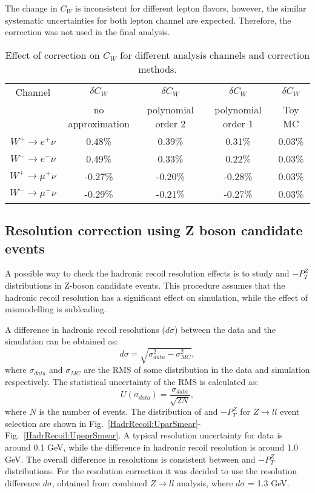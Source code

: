 The change in $C_W$ is inconsistent for different lepton flavors, however, the similar systematic uncertainties for both lepton channel are expected. Therefore, the correction was not used in the final analysis.

 \begin{table}[!t]
 \caption{Effect of \sumet correction on $C_{W}$ for different analysis channels and \sumet correction methods.}
\label{SumetCW}
\begin{center}
\begin{tabular}{c | c | c |  c |  c   }
\hline
Channel & $\delta C_W$ & $\delta C_W$ & $\delta C_W$ & $\delta C_W$ \\
& no approximation & polynomial order 2 & polynomial order 1 & Toy MC \\
\hline
\hline
$W^{+} \to e^{+}\nu$ & 0.48\% &0.39\%  & 0.31\% & 0.03\% \\
$W^{-} \to e^{-}\nu$ & 0.49\% &0.33\%  & 0.22\% & 0.03\% \\
$W^{+} \to \mu^{+}\nu$ & -0.27\% &-0.20\%  & -0.28\% & 0.03\% \\
$W^{-} \to \mu^{-}\nu$ & -0.29\% &-0.21\%  & -0.27\% & 0.03\% \\
\hline
\end{tabular}
\end{center}

\end{table}


\subsection{Resolution correction using Z boson candidate events}\label{sec:ZperpSmear}

A possible way to check the hadronic recoil resolution effects is to study \uperp and \upar  $ - P_T^{Z}$ distributions in Z-boson candidate events. This procedure assumes that the hadronic recoil resolution has a significant effect on simulation, while the effect of \sumet mismodelling is subleading.

A difference in hadronic recoil resolutions ($d\sigma$) between the data and the simulation can be obtained as:
\begin{equation}
d\sigma=\sqrt{\sigma_{data}^2-\sigma_{MC}^2},
\end{equation}
where $\sigma_{data}$ and $\sigma_{MC}$ are the RMS of some distribution in the data and simulation respectively. The statistical uncertainty of the RMS is calculated as\cite{AdvStat}:
\begin{equation}
U( \sigma_{data} ) = \frac{\sigma_{data}}{\sqrt{2N} },
\end{equation}
where $N$ is the number of events. The distribution of \uperp and \upar  $ - P_T^{Z}$ for $Z\to ll$ event selection are shown in Fig.~\ref{HadrRecoil:UparSmear}-Fig.~\ref{HadrRecoil:UpeprSmear}. A typical resolution uncertainty for data is around 0.1 GeV, while the difference in hadronic recoil resolution is around 1.0 GeV. The overall difference in resolutions is consistent between \uperp and \upar  $ - P_T^{Z}$ distributions. For the resolution correction it was decided to use the resolution difference $d\sigma$, obtained from combined $Z\to ll$ analysis, where $d\sigma$ = 1.3 GeV.

